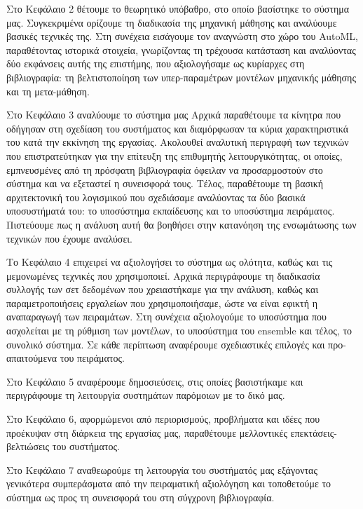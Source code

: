 Στο Κεφάλαιο 2 θέτουμε το θεωρητικό υπόβαθρο, στο οποίο βασίστηκε το σύστημα μας. Συγκεκριμένα ορίζουμε τη διαδικασία της μηχανική μάθησης και αναλύουμε βασικές τεχνικές της. Στη συνέχεια εισάγουμε τον αναγνώστη στο χώρο του AutoML, παραθέτοντας ιστορικά στοιχεία, γνωρίζοντας τη τρέχουσα κατάσταση και αναλύοντας δύο εκφάνσεις αυτής της επιστήμης, που αξιολογήσαμε ως κυρίαρχες στη βιβλιογραφία: τη βελτιστοποίηση των υπερ-παραμέτρων μοντέλων μηχανικής μάθησης και τη μετα-μάθηση.  

Στο Κεφάλαιο 3 αναλύουμε το σύστημα μας Αρχικά παραθέτουμε τα κίνητρα που οδήγησαν στη σχεδίαση του συστήματος και διαμόρφωσαν τα κύρια χαρακτηριστικά του κατά την εκκίνηση της εργασίας. Ακολουθεί αναλυτική περιγραφή των τεχνικών που επιστρατεύτηκαν για την επίτευξη της επιθυμητής λειτουργικότητας, οι οποίες, εμπνευσμένες από τη πρόσφατη βιβλιογραφία όφειλαν να προσαρμοστούν στο σύστημα και να εξεταστεί η συνεισφορά τους. Τέλος, παραθέτουμε τη βασική αρχιτεκτονική του λογισμικού που σχεδιάσαμε αναλύοντας τα δύο βασικά υποσυστήματά του: το υποσύστημα εκπαίδευσης και το υποσύστημα πειράματος. Πιστεύουμε πως η ανάλυση αυτή θα βοηθήσει στην κατανόηση της ενσωμάτωσης των τεχνικών που έχουμε αναλύσει.

Το Κεφάλαιο 4 επιχειρεί να αξιολογήσει το σύστημα ως ολότητα, καθώς και τις μεμονωμένες τεχνικές που χρησιμοποιεί. Αρχικά περιγράφουμε τη διαδικασία συλλογής των σετ δεδομένων που χρειαστήκαμε για την ανάλυση, καθώς και παραμετροποιήσεις εργαλείων που χρησιμοποιήσαμε, ώστε να είναι εφικτή η αναπαραγωγή των πειραμάτων. Στη συνέχεια αξιολογούμε το υποσύστημα που ασχολείται με τη ρύθμιση των μοντέλων, το υποσύστημα του ensemble και τέλος, το συνολικό σύστημα. Σε κάθε περίπτωση αναφέρουμε σχεδιαστικές επιλογές και προ-απαιτούμενα του πειράματος.

Στο Κεφάλαιο 5 αναφέρουμε δημοσιεύσεις, στις οποίες βασιστήκαμε και περιγράφουμε τη λειτουργία συστημάτων παρόμοιων με το δικό μας.

Στο Κεφάλαιο 6, αφορμώμενοι από περιορισμούς, προβλήματα και ιδέες που προέκυψαν στη διάρκεια της εργασίας μας, παραθέτουμε μελλοντικές επεκτάσεις-βελτιώσεις του συστήματος. 

Στο Κεφάλαιο 7 αναθεωρούμε τη λειτουργία του συστήματός μας εξάγοντας γενικότερα συμπεράσματα από την πειραματική αξιολόγηση και τοποθετούμε το σύστημα ως προς τη συνεισφορά του στη σύγχρονη βιβλιογραφία.